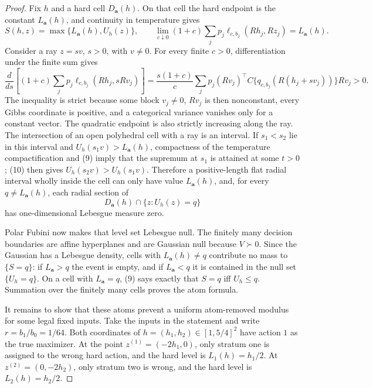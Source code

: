 \documentclass{article}
\begin{document}
\begin{proof}
Fix \(h\) and a hard cell \(D_{\mathbf a}(h)\).  On that cell the hard endpoint is the constant \(L_{\mathbf a}(h)\), and continuity in temperature gives
\[
 S(h,z)=\max\{L_{\mathbf a}(h),U_h(z)\},\qquad
 \lim_{c\downarrow0}(1+c)\sum_jp_j\ell_{c,b_j}(Rh_j,Rz_j)=L_{\mathbf a}(h).       \tag{9}
\]
Consider a ray \(z=sv\), \(s>0\), with \(v\ne0\).  For every finite \(c>0\), differentiation under the finite sum gives
\[
 \frac{d}{ds}\left[(1+c)\sum_jp_j\ell_{c,b_j}(Rh_j,sRv_j)\right]
 =\frac{s(1+c)}c\sum_jp_j(Rv_j)^\top C\{q_{c,b_j}(R(h_j+sv_j))\}Rv_j>0.          \tag{10}
\]
The inequality is strict because some block \(v_j\ne0\), \(Rv_j\) is then nonconstant, every Gibbs coordinate is positive, and a categorical variance vanishes only for a constant vector.  The quadratic endpoint is also strictly increasing along the ray.  The intersection of an open polyhedral cell with a ray is an interval.  If \(s_1<s_2\) lie in this interval and \(U_h(s_1v)>L_{\mathbf a}(h)\), compactness of the temperature compactification and (9) imply that the supremum at \(s_1\) is attained at some \(t>0\); (10) then gives \(U_h(s_2v)>U_h(s_1v)\).  Therefore a positive-length flat radial interval wholly inside the cell can only have value \(L_{\mathbf a}(h)\), and, for every \(q\ne L_{\mathbf a}(h)\), each radial section of
\[
 D_{\mathbf a}(h)\cap\{z:U_h(z)=q\}
\]
has one-dimensional Lebesgue measure zero.

Polar Fubini now makes that level set Lebesgue null.  The finitely many decision boundaries are affine hyperplanes and are Gaussian null because \(V\succ0\).  Since the Gaussian has a Lebesgue density, cells with \(L_{\mathbf a}(h)\ne q\) contribute no mass to \(\{S=q\}\): if \(L_{\mathbf a}>q\) the event is empty, and if \(L_{\mathbf a}<q\) it is contained in the null set \(\{U_h=q\}\).  On a cell with \(L_{\mathbf a}=q\), (9) says exactly that \(S=q\) iff \(U_h\le q\).  Summation over the finitely many cells proves the atom formula.

It remains to show that these atoms prevent a uniform atom-removed modulus for some legal fixed inputs.  Take the inputs in the statement and write \(r=b_1/b_0=1/64\).  Both coordinates of \(h=(h_1,h_2)\in[1,5/4]^2\) have action \(1\) as the true maximizer.  At the point \(z^{(1)}=(-2h_1,0)\), only stratum one is assigned to the wrong hard action, and the hard level is \(L_1(h)=h_1/2\).  At \(z^{(2)}=(0,-2h_2)\), only stratum two is wrong, and the hard level is \(L_2(h)=h_2/2\).


\end{proof}
\end{document}
